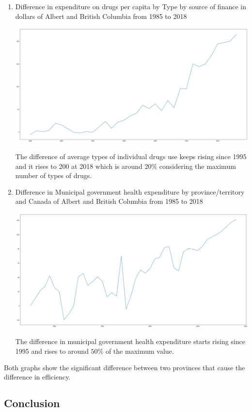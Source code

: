 \documentclass[preprint,12pt]{elsarticle}
\begin{document}
\begin{enumerate}
	\item Difference in expenditure on drugs per capita by Type by source of finance in dollars of Albert and British Columbia from 1985 to 2018
	
	\includegraphics[scale=0.2]{images/drugdrug.png}
	
	The difference of average types of individual drugs use keeps rising since 1995 and it rises to 200 at 2018 which is around $20 \%$ considering the maximum number of types of drugs.
	
    \item Difference in Municipal government health expenditure by province/territory and Canada of Albert and British Columbia from 1985 to 2018
    
    \includegraphics[scale=0.2]{download.png}
    
    The difference in municipal government health expenditure starts rising since 1995 and rises to around $50\%$ of the maximum value.
\end{enumerate}

Both graphs show the significant difference between two provinces that cause the difference in efficiency.

\newpage
\subsection{Conclusion}
\end{document}
